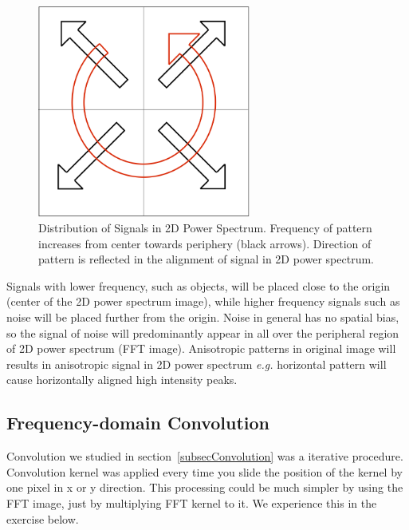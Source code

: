  \begin{figure}[H]
 \begin{center}
 \includegraphics[width=7cm]{fig/FFTscheme.png}
 \caption{ Distribution of Signals in 2D Power Spectrum. Frequency of pattern increases from center towards periphery (black arrows). Direction of pattern is reflected in the alignment of signal in 2D power spectrum.}
 \label{fig:imgFFT}
 \end{center}
 \end{figure}

Signals with lower frequency, such as objects, will be placed close to
the origin (center of the 2D power spectrum image), while higher frequency signals
such as noise will be placed further from the origin. Noise in general has no spatial bias, so the signal of noise will predominantly appear in all over the peripheral region of 2D power spectrum (FFT image). 
Anisotropic patterns in original image will results in anisotropic signal in 2D power spectrum \textit{e.g.} horizontal pattern will cause horizontally aligned high intensity peaks. 

\subsection{Frequency-domain Convolution}

Convolution we studied in section~\ref{subsecConvolution} was a iterative
procedure. Convolution kernel was applied every time you slide the position of
the kernel by one pixel in x or y direction. This processing could be much
simpler by using the FFT image, just by multiplying FFT kernel to it. We
experience this in the exercise below. 

